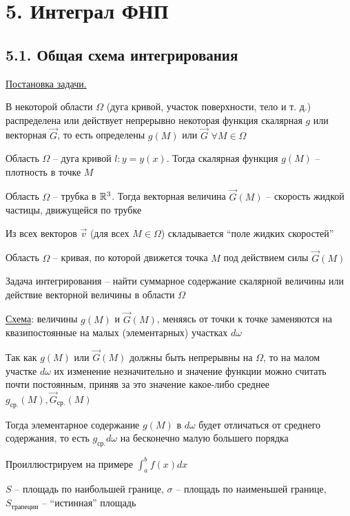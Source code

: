 \documentclass[12pt]{article}
\begin{document}
    \clearpage

    \section{5. Интеграл ФНП}

    \subsection{5.1. Общая схема интегрирования}

    \underline{Постановка задачи.}

    В некоторой области $\Omega$ (дуга кривой, участок поверхности, тело и т. д.)
    распределена или действует непрерывно некоторая функция скалярная $g$ или векторная $\vec{G}$,
    то есть определены $g(M)$ или $\vec{G}$ $\forall M \in \Omega$

    \Ex Область $\Omega$ -- дуга кривой $l : y = y(x)$. Тогда скалярная функция $g(M)$ -- плотность в точке $M$

    \Exs Область $\Omega$ -- трубка в $\mathbb{R}^3$. Тогда векторная величина $\vec{G}(M)$ -- скорость жидкой частицы, движущейся по трубке

    Из всех векторов $\vec{v}$ (для всех $M \in \Omega$) складывается \enquote{поле жидких скоростей}

    \Exs Область $\Omega$ -- кривая, по которой движется точка $M$ под действием силы $\vec{G}(M)$

    \mediumvspace

    Задача интегрирования -- найти суммарное содержание скалярной величины или действие векторной величины в области $\Omega$

    \underline{Схема}: величины $g(M)$ и $\vec{G}(M)$, меняясь от точки к точке заменяются на квазипостоянные на малых (элементарных) участках $d\omega$

    Так как $g(M)$ или $\vec{G}(M)$ должны быть непрерывны на $\Omega$, то на малом участке $d\omega$ их изменение незначительно и
    значение функции можно считать почти постоянным, приняв за это значение какое-либо среднее $g_{\text{ср.}}(M), \vec{G}_{\text{ср.}}(M)$

    Тогда элементарное содержание $g(M)$ в $d\omega$ будет отличаться от среднего содержания, то есть $g_{\text{ср.}}d\omega$ на бесконечно малую большего порядка

    \Ex Проиллюстрируем на примере $\int_a^b f(x) dx$

    $S$ -- площадь по наибольшей границе, $\sigma$ -- площадь по наименьшей границе, $S_{\text{трапеции}}$ -- \enquote{истинная} площадь
\end{document}
